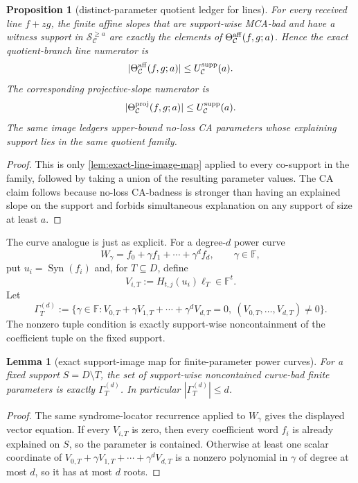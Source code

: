 \documentclass[11pt]{article}
\newtheorem{lemma}[theorem]{Lemma}
\newtheorem{proposition}[theorem]{Proposition}
\theoremstyle{definition}
\theoremstyle{remark}
\newcommand{\F}{\mathbb{F}}
\newcommand{\Syn}{\operatorname{Syn}}
\begin{document}
\begin{proposition}[distinct-parameter quotient ledger for lines]
\label{prop:distinct-parameter-line-ledger}
For every received line $f+zg$, the finite affine slopes that are support-wise
MCA-bad and have a witness support in
$\mathcal S_{\mathcal C}^{\ge a}$ are exactly the elements of
$\Theta_{\mathcal C}^{\rm aff}(f,g;a)$.  Hence the exact quotient-branch line
numerator is
\[
        |\Theta_{\mathcal C}^{\rm aff}(f,g;a)|
        \le U_{\mathcal C}^{\rm supp}(a).
\]
The corresponding projective-slope numerator is
\[
        |\Theta_{\mathcal C}^{\rm proj}(f,g;a)|
        \le U_{\mathcal C}^{\rm supp}(a).
\]
The same image ledgers upper-bound no-loss CA parameters whose explaining
support lies in the same quotient family.
\end{proposition}

\begin{proof}
This is only \cref{lem:exact-line-image-map} applied to every co-support in the
family, followed by taking a union of the resulting parameter values.  The CA
claim follows because no-loss CA-badness is stronger than having an explained
slope on the support and forbids simultaneous explanation on any support of size
at least $a$.
\end{proof}

The curve analogue is just as explicit.  For a degree-$d$ power curve
\[
        W_\gamma=f_0+\gamma f_1+\cdots+\gamma^d f_d,
        \qquad \gamma\in\F,
\]
put $u_i=\Syn(f_i)$ and, for $T\subseteq D$, define
\[
        V_{i,T}:=H_{t,j}(u_i)\boldsymbol\ell_T\in\F^t .
\]
Let
\[
        \Gamma_T^{(d)}
        :=\{\gamma\in\F:
             V_{0,T}+\gamma V_{1,T}+\cdots+\gamma^dV_{d,T}=0,
             \ (V_{0,T},\ldots,V_{d,T})\ne0\} .
\]
The nonzero tuple condition is exactly support-wise noncontainment of the
coefficient tuple on the fixed support.

\begin{lemma}[exact support-image map for finite-parameter power curves]
\label{lem:exact-curve-image-map}
For a fixed support $S=D\setminus T$, the set of support-wise noncontained
curve-bad finite parameters is exactly $\Gamma_T^{(d)}$.  In particular
$|\Gamma_T^{(d)}|\le d$.
\end{lemma}

\begin{proof}
The same syndrome-locator recurrence applied to $W_\gamma$ gives the displayed
vector equation.  If every $V_{i,T}$ is zero, then every coefficient word
$f_i$ is already explained on $S$, so the parameter is contained.  Otherwise at
least one scalar coordinate of
$V_{0,T}+\gamma V_{1,T}+\cdots+\gamma^dV_{d,T}$ is a nonzero polynomial in
$\gamma$ of degree at most $d$, so it has at most $d$ roots.
\end{proof}
\end{document}

